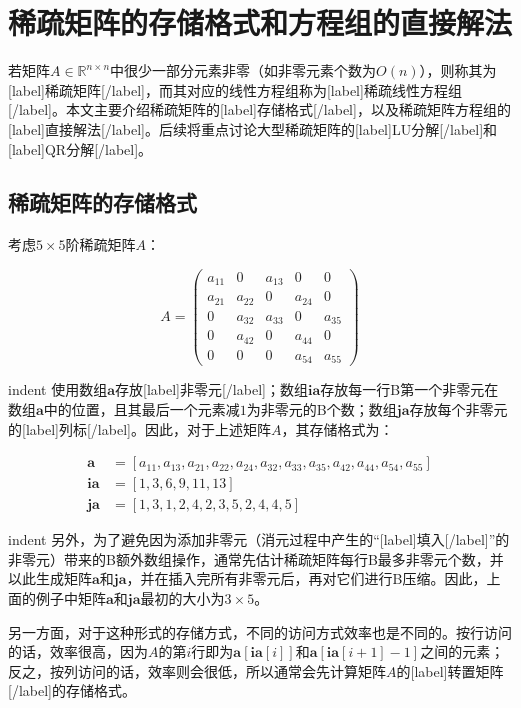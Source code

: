 \documentclass[UTF8,nofonts]{ctexart}
\begin{document}
\section*{稀疏矩阵的存储格式和方程组的直接解法}

若矩阵$A\in\mathbb{R}^{n \times n}$中很少一部分元素非零（如非零元素个数为$O(n)$），则称其为[label]稀疏矩阵[/label]，而其对应的线性方程组称为[label]稀疏线性方程组[/label]。本文主要介绍稀疏矩阵的[label]存储格式[/label]，以及稀疏矩阵方程组的[label]直接解法[/label]。后续将重点讨论大型稀疏矩阵的[label]LU分解[/label]和[label]QR分解[/label]。

\subsection*{稀疏矩阵的存储格式}

考虑$5 \times  5$阶稀疏矩阵$A$：

\[
A=
\begin{pmatrix}
a_{11} & 0 & a_{13} & 0 & 0 \\
a_{21} & a_{22} & 0 & a_{24} & 0 \\
0 & a_{32} & a_{33} & 0 & a_{35} \\
0 & a_{42} & 0 & a_{44} & 0 \\
0 & 0 & 0 & a_{54} & a_{55}
\end{pmatrix}
\]

indent 使用数组$\boldsymbol{a}$存放[label]非零元[/label]；数组$\boldsymbol{ia}$存放每一行B第一个非零元在数组$\boldsymbol{a}$中的位置，且其最后一个元素减$1$为非零元的B个数；数组$\boldsymbol{ja}$存放每个非零元的[label]列标[/label]。因此，对于上述矩阵$A$，其存储格式为：

\begin{align*}
\boldsymbol{a} &= [a_{11},a_{13},a_{21},a_{22},a_{24},a_{32},a_{33},a_{35},a_{42},a_{44},a_{54},a_{55}] \\
\boldsymbol{ia} &= [1,3,6,9,11,13] \\
\boldsymbol{ja} &= [1,3,1,2,4,2,3,5,2,4,4,5]
\end{align*}

indent 另外，为了避免因为添加非零元（消元过程中产生的“[label]填入[/label]”的非零元）带来的B额外数组操作，通常先估计稀疏矩阵每行B最多非零元个数，并以此生成矩阵$\boldsymbol{a}$和$\boldsymbol{ja}$，并在插入完所有非零元后，再对它们进行B压缩。因此，上面的例子中矩阵$\boldsymbol{a}$和$\boldsymbol{ja}$最初的大小为$3 \times 5$。

另一方面，对于这种形式的存储方式，不同的访问方式效率也是不同的。按行访问的话，效率很高，因为$A$的第$i$行即为$\boldsymbol{a}[\boldsymbol{ia}[i]]$和$\boldsymbol{a}[\boldsymbol{ia}[i+1]-1]$之间的元素；反之，按列访问的话，效率则会很低，所以通常会先计算矩阵$A$的[label]转置矩阵[/label]的存储格式。
\end{document}
